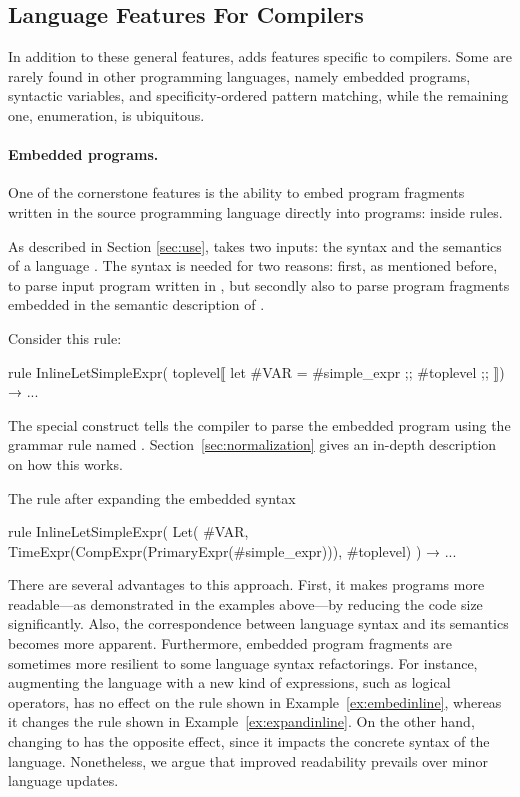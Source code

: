 \subsection{\Tosca Language Features For Compilers} \label{sec:surface}

In addition to these general features, \Tosca adds features specific to compilers.
Some are rarely found in other programming languages, namely embedded programs,
syntactic variables, and specificity-ordered pattern matching, while the remaining
one, enumeration, is ubiquitous.  

\paragraph{Embedded programs.} One of the cornerstone \Tosca
features is the ability to embed program fragments written in the source programming language \PL
directly into \Tosca programs: inside rules.

As described in Section \ref{sec:use}, \Tosca takes
two inputs: the syntax and the semantics of a language \PL. The syntax is
needed for two reasons: first, as mentioned before, to parse input program written in \PL, 
but secondly also to parse program fragments embedded in the semantic description of \PL. 
%
\begin{example} \label{ex:embedinline} %
Consider this rule:   
\begin{lstTosca}
rule InlineLetSimpleExpr( 
  toplevel⟦ let #VAR = #simple_expr ;; #toplevel ;; ⟧)
  → ...
\end{lstTosca}
\end{example} 
%
The special construct  tells the
\Tosca compiler to parse the embedded program using the grammar
rule named . Section~\ref{sec:normalization} 
gives an in-depth description on how this works.
%
\begin{example} \label{ex:expandinline} %
  The rule after expanding the embedded syntax
\begin{lstTosca}
rule InlineLetSimpleExpr( Let( #VAR, TimeExpr(CompExpr(PrimaryExpr(#simple_expr))), 
                               #toplevel) )
  → ...
\end{lstTosca}
\end{example}
%
There are several advantages to this approach. First, it makes
\Tosca programs more readable---as demonstrated in the examples
above---by reducing the code size significantly. Also, the
correspondence between language syntax and its semantics becomes more
apparent. Furthermore, embedded program fragments are sometimes more
resilient to some language syntax refactorings. For instance,
augmenting the \MiniML language with a new kind of expressions, such
as logical operators, has no effect on the rule shown in
Example~\ref{ex:embedinline}, whereas it changes the rule shown in
Example~\ref{ex:expandinline}.  On the other hand, changing
 to  has the opposite effect, since it
impacts the concrete syntax of the language.  Nonetheless, we argue
that improved readability prevails over minor language updates.
%
